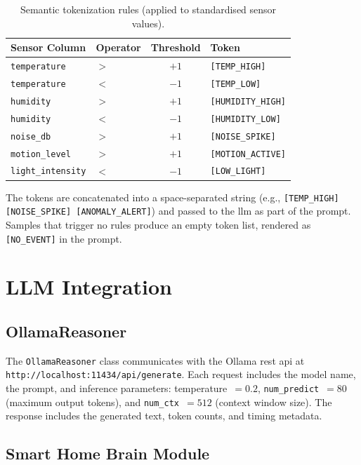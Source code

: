 \documentclass[12pt,a4paper,oneside]{report}
\begin{document}
\begin{table}[htbp]
\caption{Semantic tokenization rules (applied to standardised sensor values).}
\label{tab:token-rules}
\centering
\begin{tabular}{llcl}
\toprule
\textbf{Sensor Column} & \textbf{Operator} & \textbf{Threshold} & \textbf{Token} \\
\midrule
\texttt{temperature}     & $>$  & $+1$ & \texttt{[TEMP\_HIGH]} \\
\texttt{temperature}     & $<$  & $-1$ & \texttt{[TEMP\_LOW]} \\
\texttt{humidity}        & $>$  & $+1$ & \texttt{[HUMIDITY\_HIGH]} \\
\texttt{humidity}        & $<$  & $-1$ & \texttt{[HUMIDITY\_LOW]} \\
\texttt{noise\_db}       & $>$  & $+1$ & \texttt{[NOISE\_SPIKE]} \\
\texttt{motion\_level}   & $>$  & $+1$ & \texttt{[MOTION\_ACTIVE]} \\
\texttt{light\_intensity} & $<$ & $-1$ & \texttt{[LOW\_LIGHT]} \\
\bottomrule
\end{tabular}
\end{table}

The tokens are concatenated into a space-separated string (e.g., \texttt{[TEMP\_HIGH] [NOISE\_SPIKE] [ANOMALY\_ALERT]}) and passed to the \gls{llm} as part of the prompt. Samples that trigger no rules produce an empty token list, rendered as \texttt{[NO\_EVENT]} in the prompt.


\section{LLM Integration}
\label{sec:impl-llm}

\subsection{OllamaReasoner}

The \texttt{OllamaReasoner} class communicates with the Ollama \gls{rest} \gls{api} at \texttt{http://localhost:11434/api/generate}. Each request includes the model name, the prompt, and inference parameters: temperature~$=0.2$, \texttt{num\_predict}~$=80$ (maximum output tokens), and \texttt{num\_ctx}~$=512$ (context window size). The response includes the generated text, token counts, and timing metadata.

\subsection{Smart Home Brain Module}
\end{document}
